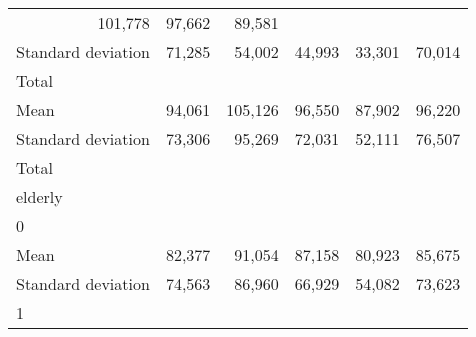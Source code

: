 \begin{tabular}{llllll}
  \multicolumn{1}{r}{101,778} &
  \multicolumn{1}{r}{97,662} &
  \multicolumn{1}{r}{89,581} \\
\multicolumn{1}{l}{\hspace{4em}Standard deviation} &
  \multicolumn{1}{|r}{71,285} &
  \multicolumn{1}{r}{54,002} &
  \multicolumn{1}{r}{44,993} &
  \multicolumn{1}{r}{33,301} &
  \multicolumn{1}{r}{70,014} \\
\multicolumn{1}{l}{\hspace{3em}Total} &
  \multicolumn{1}{|r}{} &
  \multicolumn{1}{r}{} &
  \multicolumn{1}{r}{} &
  \multicolumn{1}{r}{} &
  \multicolumn{1}{r}{} \\
\multicolumn{1}{l}{\hspace{4em}Mean} &
  \multicolumn{1}{|r}{94,061} &
  \multicolumn{1}{r}{105,126} &
  \multicolumn{1}{r}{96,550} &
  \multicolumn{1}{r}{87,902} &
  \multicolumn{1}{r}{96,220} \\
\multicolumn{1}{l}{\hspace{4em}Standard deviation} &
  \multicolumn{1}{|r}{73,306} &
  \multicolumn{1}{r}{95,269} &
  \multicolumn{1}{r}{72,031} &
  \multicolumn{1}{r}{52,111} &
  \multicolumn{1}{r}{76,507} \\
\multicolumn{1}{l}{\hspace{1em}Total} &
  \multicolumn{1}{|r}{} &
  \multicolumn{1}{r}{} &
  \multicolumn{1}{r}{} &
  \multicolumn{1}{r}{} &
  \multicolumn{1}{r}{} \\
\multicolumn{1}{l}{\hspace{2em}elderly} &
  \multicolumn{1}{|r}{} &
  \multicolumn{1}{r}{} &
  \multicolumn{1}{r}{} &
  \multicolumn{1}{r}{} &
  \multicolumn{1}{r}{} \\
\multicolumn{1}{l}{\hspace{3em}0} &
  \multicolumn{1}{|r}{} &
  \multicolumn{1}{r}{} &
  \multicolumn{1}{r}{} &
  \multicolumn{1}{r}{} &
  \multicolumn{1}{r}{} \\
\multicolumn{1}{l}{\hspace{4em}Mean} &
  \multicolumn{1}{|r}{82,377} &
  \multicolumn{1}{r}{91,054} &
  \multicolumn{1}{r}{87,158} &
  \multicolumn{1}{r}{80,923} &
  \multicolumn{1}{r}{85,675} \\
\multicolumn{1}{l}{\hspace{4em}Standard deviation} &
  \multicolumn{1}{|r}{74,563} &
  \multicolumn{1}{r}{86,960} &
  \multicolumn{1}{r}{66,929} &
  \multicolumn{1}{r}{54,082} &
  \multicolumn{1}{r}{73,623} \\
\multicolumn{1}{l}{\hspace{3em}1} &

\end{tabular}
